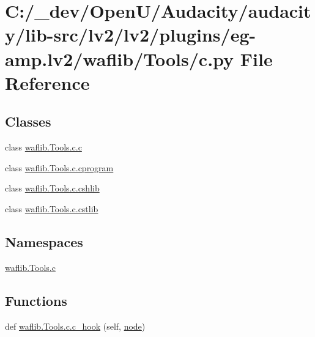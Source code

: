 \hypertarget{lv2_2plugins_2eg-amp_8lv2_2waflib_2_tools_2c_8py}{}\section{C\+:/\+\_\+dev/\+Open\+U/\+Audacity/audacity/lib-\/src/lv2/lv2/plugins/eg-\/amp.lv2/waflib/\+Tools/c.py File Reference}
\label{lv2_2plugins_2eg-amp_8lv2_2waflib_2_tools_2c_8py}
\subsection*{Classes}
\begin{DoxyCompactItemize}
\item 
class \hyperlink{classwaflib_1_1_tools_1_1c_1_1c}{waflib.\+Tools.\+c.\+c}
\item 
class \hyperlink{classwaflib_1_1_tools_1_1c_1_1cprogram}{waflib.\+Tools.\+c.\+cprogram}
\item 
class \hyperlink{classwaflib_1_1_tools_1_1c_1_1cshlib}{waflib.\+Tools.\+c.\+cshlib}
\item 
class \hyperlink{classwaflib_1_1_tools_1_1c_1_1cstlib}{waflib.\+Tools.\+c.\+cstlib}
\end{DoxyCompactItemize}
\subsection*{Namespaces}
\begin{DoxyCompactItemize}
\item 
 \hyperlink{namespacewaflib_1_1_tools_1_1c}{waflib.\+Tools.\+c}
\end{DoxyCompactItemize}
\subsection*{Functions}
\begin{DoxyCompactItemize}
\item 
def \hyperlink{namespacewaflib_1_1_tools_1_1c_a133cda6439588809c5d3ccdc6bf3c5d1}{waflib.\+Tools.\+c.\+c\+\_\+hook} (self, \hyperlink{structnode}{node})
\end{DoxyCompactItemize}
